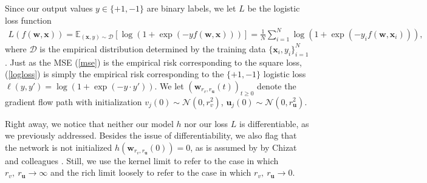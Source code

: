 \documentclass{article}
\begin{document}
Since our output values $y \in \{+1, -1\}$ are binary labels, we let $L$ be the logistic loss function
\begin{align}\label{logloss}
    L(f(\boldsymbol{w}, \boldsymbol{x})) = \mathbb{E}_{(\boldsymbol{x}, y) \sim \mathcal{D}} \left[\log \left( 1 + \exp(-y f(\boldsymbol{w}, \boldsymbol{x})) \right) \right] = \frac{1}{N} \sum_{i=1}^N \log \left( 1 + \exp(-y_i f(\boldsymbol{w}, \boldsymbol{x}_i)) \right),
\end{align}
where $\mathcal{D}$ is the empirical distribution determined by the training data $\{ \boldsymbol{x}_i, y_i \}_{i=1}^N$ \cite{wei2019regularization}. Just as the MSE (\ref{mse}) is the empirical risk corresponding to the square loss, (\ref{logloss}) is simply the empirical risk corresponding to the $\{+1, -1\}$ logistic loss $\ell(y, y') = \log( 1 + \exp(-y \cdot y'))$. We let $(\boldsymbol{w}_{r_v, r_{\boldsymbol{u}}}(t))_{t \geq 0}$ denote the gradient flow path with initialization $v_j(0) \sim \mathcal{N}(0, r_v^2)$, $\boldsymbol{u}_j(0) \sim \mathcal{N}(0, r_{\boldsymbol{u}}^2)$.

Right away, we notice that neither our model $h$ nor our loss $L$ is differentiable, as we previously addressed. Besides the issue of differentiability, we also flag that the network is not initialized $h(\boldsymbol{w}_{r_v, r_{\boldsymbol{u}}}(0)) = 0$, as is assumed by by Chizat and colleagues \cite{chizat2018lazy}. Still, we use the kernel limit to refer to the case in which $r_v, \ r_{\boldsymbol{u}} \rightarrow \infty$ and the rich limit loosely to refer to the case in which $r_v, \ r_{\boldsymbol{u}} \rightarrow 0$. 
\end{document}
